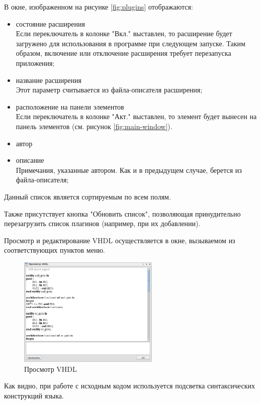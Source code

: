 В окне, изображенном на рисунке \ref{fig:plugins} отображаются:
\begin{itemize}
  \item состояние расширения\\
  Если переключатель в колонке "Вкл." выставлен, то расширение будет загружено для использования в программе при следующем запуске.
  Таким образом, включение или отключение расширения требует перезапуска приложения;
  \item название расширения\\
  Этот параметр считывается из файла-описателя расширения;
  \item расположение на панели элементов\\
  Если переключатель в колонке "Акт." выставлен, то элемент будет вынесен на панель элементов (см. рисунок \ref{fig:main-window}).
  \item автор
  \item описание\\
  Примечания, указанные автором. Как и в предыдущем случае, берется из файла-описателя;
\end{itemize}

Данный список является сортируемым по всем полям.

Также присутствует кнопка "Обновить список", позволяющая принудительно перезагрузить список плагинов (например, при их добавлении).


Просмотр и редактирование VHDL осуществляется в окне, вызываемом из соответствующих пунктов меню.
\begin{figure}[H]
  \centering
  \includegraphics[width=0.6\textwidth]{gui/vhdl-view.png}
  \caption{Просмотр VHDL}
  \label{fig:vhdl-view}
\end{figure}

Как видно, при работе с исходным кодом используется подсветка синтаксических конструкций языка.